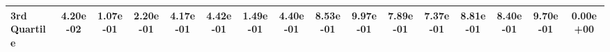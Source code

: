 {\begin{tabular} {lccccccccccccccc}
\hspace{7pt}3rd Quartile & \cellcolor{bronze!60}4.20e-02 & \cellcolor{bronze!60}1.07e-01 & \cellcolor{bronze!60}2.20e-01 & \cellcolor{bronze!60}4.17e-01 & \cellcolor{bronze!60}4.42e-01 & \cellcolor{bronze!60}1.49e-01 & \cellcolor{bronze!60}4.40e-01 & \cellcolor{bronze!60}8.53e-01 & \cellcolor{bronze!60}9.97e-01 & \cellcolor{bronze!60}7.89e-01 & \cellcolor{bronze!60}7.37e-01 & \cellcolor{bronze!60}8.81e-01 & \cellcolor{bronze!60}8.40e-01 & \cellcolor{bronze!60}9.70e-01 & \cellcolor{gold!60}0.00e+00 \\ 
\bottomrule
\end{tabular}}